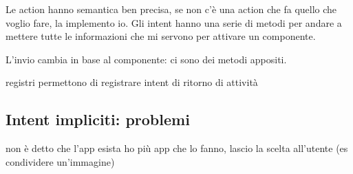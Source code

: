 Le action hanno semantica ben precisa, se non c'è una action che fa quello che voglio fare, la implemento io.
Gli intent hanno una serie di metodi per andare a mettere tutte le informazioni che mi servono per attivare un componente.

L'invio cambia in base al componente: ci sono dei metodi appositi.

registri permettono di registrare intent di ritorno di attività

\subsection{Intent impliciti: problemi}
non è detto che l'app esista
ho più app che lo fanno, lascio la scelta all'utente (es condividere un'immagine)

